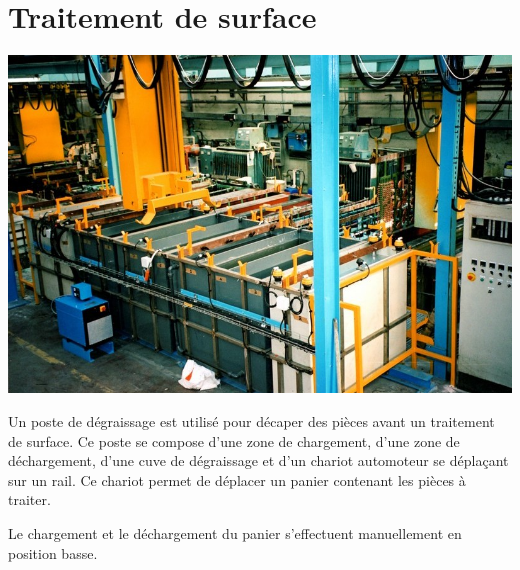 \newpage

\section{Traitement de surface}


\begin{minipage}{0.4\linewidth}
 \centering\includegraphics[width=0.7\linewidth]{img/Traitement1.jpg}
\end{minipage}
\hfill
\begin{minipage}{0.58\linewidth}
Un poste de dégraissage est utilisé pour décaper des pièces avant un traitement de surface. Ce poste se compose d'une zone de chargement, d'une zone de déchargement, d'une cuve de dégraissage et d'un chariot automoteur se déplaçant sur un rail. Ce chariot permet de déplacer un panier contenant les pièces à traiter. 

Le chargement et le déchargement du panier s'effectuent manuellement en position basse.
\end{minipage}

